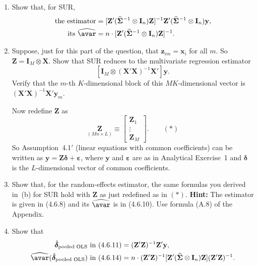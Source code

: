\begin{problemset}
\begin{enumerate}[label=(\alph*)]
\item Show that, for SUR,
\begin{align*}
\text{the estimator} &= [\mathbf{Z}'(\widehat{\boldsymbol{\Sigma}}^{-1} \otimes
\mathbf{I}_n)\mathbf{Z}]^{-1}
\mathbf{Z}'(\widehat{\boldsymbol{\Sigma}}^{-1} \otimes \mathbf{I}_n)\mathbf{y}, \\
\text{its } \widehat{\avar} &= n \cdot
[\mathbf{Z}'(\widehat{\boldsymbol{\Sigma}}^{-1} \otimes \mathbf{I}_n)\mathbf{Z}]^{-1}.
\end{align*}

\item Suppose, just for this part of the question, that $\mathbf{z}_{im} = \mathbf{x}_i$
for all $m$. So $\mathbf{Z} = \mathbf{I}_M \otimes \mathbf{X}$.
Show that SUR reduces to the multivariate regression estimator
\[
[\mathbf{I}_M \otimes (\mathbf{X}'\mathbf{X})^{-1}\mathbf{X}']\mathbf{y}.
\]
Verify that the $m$-th $K$-dimensional block of this $MK$-dimensional vector is
$(\mathbf{X}'\mathbf{X})^{-1}\mathbf{X}'\mathbf{y}_m$.

Now redefine $\mathbf{Z}$ as
\[
\underset{(Mn \times L)}{\mathbf{Z}}
\equiv \begin{bmatrix} \mathbf{Z}_1 \\ \vdots \\ \mathbf{Z}_M \end{bmatrix}. \qquad (*)
\]
So Assumption~4.1$'$ (linear equations with common coefficients) can be written
as $\mathbf{y} = \mathbf{Z}\boldsymbol{\delta} + \boldsymbol{\varepsilon}$,
where $\mathbf{y}$ and $\boldsymbol{\varepsilon}$ are as in Analytical Exercise~1
and $\boldsymbol{\delta}$ is the $L$-dimensional vector of common coefficients.

\item Show that, for the random-effects estimator, the same formulas you derived
in~(b) for SUR hold with $\mathbf{Z}$ as just redefined as in $(*)$.
\textbf{Hint:} The estimator is given in (4.6.8) and its $\widehat{\avar}$ is in
(4.6.10). Use formula (A.8) of the Appendix.

\item Show that
\begin{align*}
\hat{\boldsymbol{\delta}}_{\text{pooled OLS}} \text{ in (4.6.11)}
&= (\mathbf{Z}'\mathbf{Z})^{-1}\mathbf{Z}'\mathbf{y}, \\
\widehat{\avar}(\hat{\boldsymbol{\delta}}_{\text{pooled OLS}}) \text{ in (4.6.14)}
&= n \cdot (\mathbf{Z}'\mathbf{Z})^{-1}
[\mathbf{Z}'(\widehat{\boldsymbol{\Sigma}} \otimes \mathbf{I}_n)\mathbf{Z}]
(\mathbf{Z}'\mathbf{Z})^{-1}.
\end{align*}


\end{enumerate}
\end{problemset}

